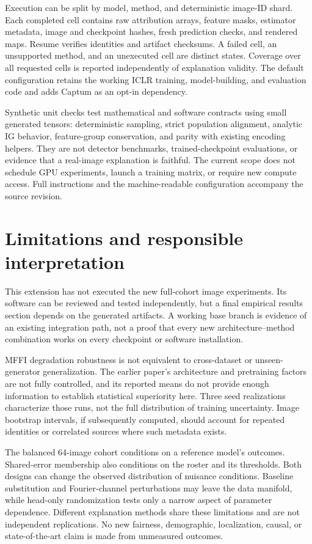 \documentclass[conference,10pt,letterpaper]{IEEEtran}
\begin{document}
Execution can be split by model, method, and deterministic image-ID shard. Each completed cell contains raw attribution arrays, feature masks, estimator metadata, image and checkpoint hashes, fresh prediction checks, and rendered maps. Resume verifies identities and artifact checksums. A failed cell, an unsupported method, and an unexecuted cell are distinct states. Coverage over all requested cells is reported independently of explanation validity. The default configuration retains the working ICLR training, model-building, and evaluation code and adds Captum as an opt-in dependency.

Synthetic unit checks test mathematical and software contracts using small generated tensors: deterministic sampling, strict population alignment, analytic IG behavior, feature-group conservation, and parity with existing encoding helpers. They are not detector benchmarks, trained-checkpoint evaluations, or evidence that a real-image explanation is faithful. The current scope does not schedule GPU experiments, launch a training matrix, or require new compute access. Full instructions and the machine-readable configuration accompany the source revision.

\section{Limitations and responsible interpretation}
This extension has not executed the new full-cohort image experiments. Its software can be reviewed and tested independently, but a final empirical results section depends on the generated artifacts. A working base branch is evidence of an existing integration path, not a proof that every new architecture--method combination works on every checkpoint or software installation.

MFFI degradation robustness is not equivalent to cross-dataset or unseen-generator generalization. The earlier paper's architecture and pretraining factors are not fully controlled, and its reported means do not provide enough information to establish statistical superiority here. Three seed realizations characterize those runs, not the full distribution of training uncertainty. Image bootstrap intervals, if subsequently computed, should account for repeated identities or correlated sources where such metadata exists.

The balanced 64-image cohort conditions on a reference model's outcomes. Shared-error membership also conditions on the roster and its thresholds. Both designs can change the observed distribution of nuisance conditions. Baseline substitution and Fourier-channel perturbations may leave the data manifold, while head-only randomization tests only a narrow aspect of parameter dependence. Different explanation methods share these limitations and are not independent replications. No new fairness, demographic, localization, causal, or state-of-the-art claim is made from unmeasured outcomes.
\end{document}
